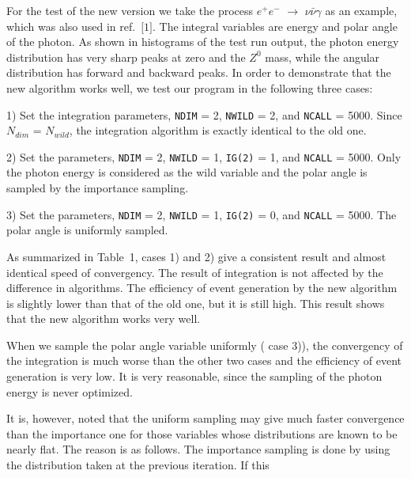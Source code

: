 \vskip 1.0cm
\par\medskip
{}
\par\smallskip
For the test of the new version we take the process ${e^+e^-}$
${\rightarrow}$ ${\nu \bar{\nu} \gamma}$ as an example, which was also used in 
ref.~$\lbrack 1 \rbrack$.
The integral variables are energy and polar angle of the photon.
As shown in histograms of the test run output, the photon energy distribution
has very sharp peaks at zero and the $Z^0$ mass, while the angular distribution
has forward and backward peaks.
In order to demonstrate that the new algorithm works well, we test our program
in the following three cases:
{\small\begin{description}
\item{1)} Set the integration parameters, {\tt NDIM} = 2, {\tt NWILD} = 2, and
{\tt NCALL} = 5000.
          Since $N_{dim}$ = $N_{wild}$, the integration algorithm is exactly
          identical to the old one.
\item{2)} Set the parameters, {\tt NDIM} = 2, {\tt NWILD} = 1, {\tt IG(2)} = 1,
and {\tt NCALL} = 5000.
          Only the photon energy is considered as the wild variable and 
          the polar angle is sampled by the importance sampling.
\item{3)} Set the parameters, {\tt NDIM} = 2, {\tt NWILD} = 1, {\tt IG(2)} =
0, and {\tt NCALL} = 5000.
          The polar angle is uniformly sampled.
\end{description}}
\noindent
As summarized in Table~1, cases 1) and 2) give a consistent result and almost
identical speed of convergency.  
The result of integration
is not affected by the difference in algorithms. The efficiency of event
generation by the new algorithm is slightly lower than that of the old one, but
it is still high.
This result shows that the new algorithm works very well.
\par\noindent
When we sample
the polar angle variable uniformly ( case 3)), the convergency of the
integration is much worse than the other two cases and the efficiency of event
generation is very low. 
It is very
reasonable, since the sampling of the photon energy is never optimized. 
\par 
It is, however, noted that the uniform sampling may give much faster
convergence than the importance one for those variables whose distributions are
known to be nearly flat. The reason is as follows. The importance sampling is
done by using the distribution taken at the previous iteration. If this
